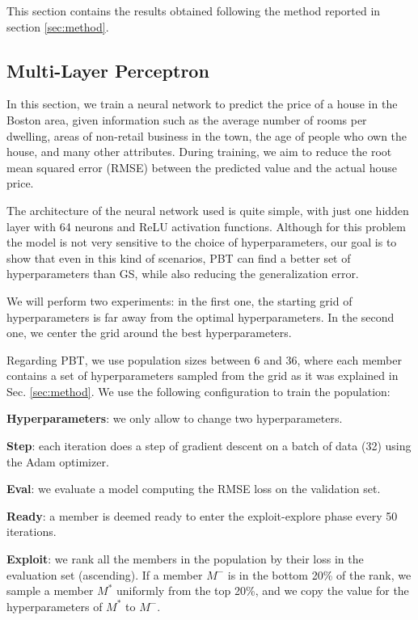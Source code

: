 \documentclass{article}
\begin{document}
This section contains the results obtained following the method reported in section \ref{sec:method}.

\subsection{Multi-Layer Perceptron}
\label{sec:fcnn}

In this section, we train a neural network to predict the price of a house in the Boston area, given information such as the average number of rooms per dwelling, areas of non-retail business in the town, the age of people who own the house, and many other attributes. During training, we aim to reduce the root mean squared error (RMSE) between the predicted value and the actual house price.

The architecture of the neural network used is quite simple, with just one hidden layer with 64 neurons and ReLU activation functions. Although for this problem the model is not very sensitive to the choice of hyperparameters, our goal is to show that even in this kind of scenarios, PBT can find a better set of hyperparameters than GS, while also reducing the generalization error.

We will perform two experiments: in the first one, the starting grid of hyperparameters is far away from the optimal hyperparameters. In the second one, we center the grid around the best hyperparameters.

Regarding PBT, we use population sizes between 6 and 36, where each member contains a set of hyperparameters sampled from the grid as it was explained in Sec. \ref{sec:method}. We use the following configuration to train the population:

\textbf{Hyperparameters}: we only allow to change two hyperparameters.

\textbf{Step}: each iteration does a step of gradient descent on a batch of data (32) using the Adam optimizer.

\textbf{Eval}: we evaluate a model computing the RMSE loss on the validation set.

\textbf{Ready}: a member is deemed ready to enter the exploit-explore phase every 50 iterations.

\textbf{Exploit}: we rank all the members in the population by their loss in the evaluation set (ascending). If a member $M^-$ is in the bottom 20\% of the rank, we sample a member $M^*$ uniformly from the top 20\%, and we copy the value for the hyperparameters of $M^*$ to $M^-$.
\end{document}
